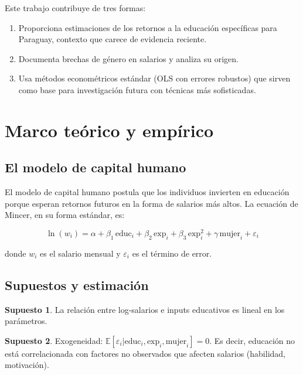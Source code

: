 \documentclass[12pt, a4paper]{article}
\newcommand{\E}{\mathbb{E}}
\theoremstyle{definition}
\newtheorem{assumption}{Supuesto}
\theoremstyle{remark}
\begin{document}
Este trabajo contribuye de tres formas:

\begin{enumerate}
  \item Proporciona estimaciones de los retornos a la educación específicas 
        para Paraguay, contexto que carece de evidencia reciente.
  \item Documenta brechas de género en salarios y analiza su origen.
  \item Usa métodos econométricos estándar (OLS con errores robustos) que 
        sirven como base para investigación futura con técnicas más sofisticadas.
\end{enumerate}

\section{Marco teórico y empírico}

\subsection{El modelo de capital humano}

El modelo de capital humano postula que los individuos invierten en educación 
porque esperan retornos futuros en la forma de salarios más altos. La ecuación 
de Mincer, en su forma estándar, es:

\begin{equation}
  \ln(w_i) = \alpha + \beta_1 \, \text{educ}_i + \beta_2 \, \text{exp}_i 
             + \beta_3 \, \text{exp}_i^2 + \gamma \, \text{mujer}_i + \varepsilon_i
  \label{eq:mincer}
\end{equation}

donde $w_i$ es el salario mensual y $\varepsilon_i$ es el término de error.

\subsection{Supuestos y estimación}

\begin{assumption}
  \label{ass:linearity}
  La relación entre log-salarios e inputs educativos es lineal en los parámetros.
\end{assumption}

\begin{assumption}
  \label{ass:ceteris}
  \label{ass:exogeneity}
  Exogeneidad: $\E[\varepsilon_i | \text{educ}_i, \text{exp}_i, \text{mujer}_i] = 0$. 
  Es decir, educación no está correlacionada con factores no observados que 
  afecten salarios (habilidad, motivación).
\end{assumption}
\end{document}
